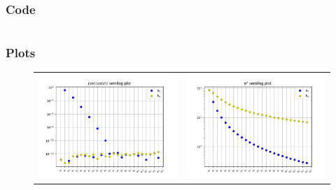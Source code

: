 \documentclass[11pt, a4paper, twoside]{article}
\begin{document}
            \subsubsection{Code}
                \inputminted[linenos, breaklines]{python}{Code/q3.py}
            \subsubsection{Plots}
                \begin{figure}[H]
                    \centering
                    \setlength\tabcolsep{2pt}
                    \begin{tabular}{cc}
                       \includegraphics[scale=0.5]{Plots/Figure 3.png} &
                       \includegraphics[scale=0.5]{Plots/Figure 4.png}\\

\end{tabular}
\end{figure}
\end{document}
